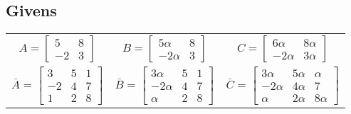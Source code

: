 \documentclass{article}
\begin{document}
    \subsection{Givens}
      \begin{center}
      \begin{tabular}{ccc}
        $A=\begin{bmatrix}5&8\\-2&3\end{bmatrix}$
         & $B=\begin{bmatrix}5\alpha&8\\-2\alpha&3\end{bmatrix}$
         & $C=\begin{bmatrix}6\alpha&8\alpha\\-2\alpha&3\alpha\end{bmatrix}$
        \\[0.5cm]
        $\bar{A}=\begin{bmatrix}3&5&1\\-2&4&7\\1&2&8\end{bmatrix}$
         & $\bar{B}=\begin{bmatrix}3\alpha&5&1\\-2\alpha&4&7\\\alpha&2&8\end{bmatrix}$
         & $\bar{C}=\begin{bmatrix}3\alpha&5\alpha&\alpha\\-2\alpha&4\alpha&7\\\alpha&2\alpha&8\alpha\end{bmatrix}$
      \end{tabular}
      \end{center}
\end{document}
